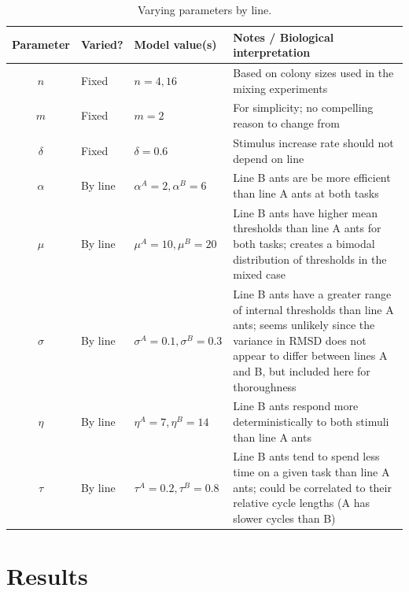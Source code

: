 \documentclass[11pt]{article}
\begin{document}
\begin{table}[H] \small
  \begin{center}
    \begin{tabular}{|c|>{\centering}m{0.6in}|>{\centering}m{1.15in}|m{3.5in}|} 
      \hline
      \textbf{Parameter} & \textbf{Varied?} & \textbf{Model value(s)} & \textbf{Notes / Biological interpretation} \\ \hline
      $n$ & Fixed & $n = 4, 16$ & Based on colony sizes used in the mixing experiments \\ \hline
      $m$ & Fixed & $m = 2$ & For simplicity; no compelling reason to change from \cite{ulrich2018} \\ \hline
      $\delta$ & Fixed & $\delta = 0.6$ & Stimulus increase rate should not depend on line\\ \hline
      $\alpha$ & By line  & $\alpha^A = 2,\alpha^B = 6$ & Line B ants are be more efficient than line A ants at both tasks \\ \hline
      $\mu$ & By line  & $\mu^A = 10,\mu^B = 20 $ & Line B ants have higher mean thresholds than line A ants for both tasks; creates a bimodal distribution of thresholds in the mixed case \\ \hline
      $\sigma$ & By line & $\sigma^A = 0.1, \sigma^B = 0.3$ & Line B ants have a greater range of internal thresholds than line A ants; seems unlikely since the variance in RMSD does not appear to differ between lines A and B, but included here for thoroughness \\ \hline
      $\eta$ & By line & $\eta^A = 7, \eta^B = 14 $ &  Line B ants respond more deterministically to both stimuli than line A ants\\ \hline
      $\tau$ & By line & $\tau^A = 0.2,\tau^B = 0.8 $ & Line B ants tend to spend less time on a given task than line A ants; could be correlated to their relative cycle lengths (A has slower cycles than B) \\ \hline
    \end{tabular}
    \caption{Varying parameters by line.}
    \label{tab:byline}
  \end{center}
\end{table}


\section{Results}
\end{document}

